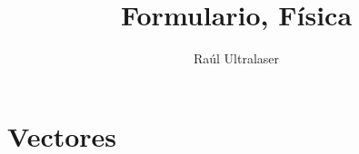 \documentclass{article}
\title{Formulario, Física}
\author{Raúl Ultralaser}
\date{}
\begin{document}
\maketitle

\section{Vectores}
\end{document}
